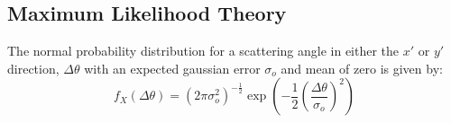 \documentclass[a4paper,11pt]{article}
\begin{document}














\subsection{Maximum Likelihood Theory}\label{likelihood_theory_section}

The normal probability distribution for a scattering angle in either the $x'$ or $y'$ direction, $\Delta\theta$ with an expected gaussian error $\sigma_o$ and mean of zero is given by:
\begin{equation}
f_X(\Delta\theta) = (2\pi\sigma_o^2)^{-\frac{1}{2}}\exp(-\frac{1}{2}(\frac{\Delta\theta}{\sigma_o})^2)
\end{equation}
\end{document}
